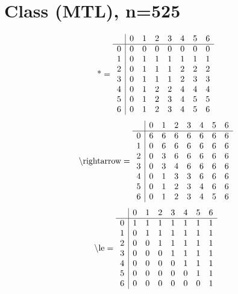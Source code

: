 \documentclass[11pt]{article}
\begin{document}
\section{Class (MTL), n=525}
\[\text{*} = 
\begin{array}{r | r r r r r r r}
 & 0 & 1 & 2 & 3 & 4 & 5 & 6 \\ \hline
0 & 0 & 0 & 0 & 0 & 0 & 0 & 0 \\
1 & 0 & 1 & 1 & 1 & 1 & 1 & 1 \\
2 & 0 & 1 & 1 & 1 & 2 & 2 & 2 \\
3 & 0 & 1 & 1 & 1 & 2 & 3 & 3 \\
4 & 0 & 1 & 2 & 2 & 4 & 4 & 4 \\
5 & 0 & 1 & 2 & 3 & 4 & 5 & 5 \\
6 & 0 & 1 & 2 & 3 & 4 & 5 & 6 \\
\end{array}
\]
\[\text{\textbackslash rightarrow} = 
\begin{array}{r | r r r r r r r}
 & 0 & 1 & 2 & 3 & 4 & 5 & 6 \\ \hline
0 & 6 & 6 & 6 & 6 & 6 & 6 & 6 \\
1 & 0 & 6 & 6 & 6 & 6 & 6 & 6 \\
2 & 0 & 3 & 6 & 6 & 6 & 6 & 6 \\
3 & 0 & 3 & 4 & 6 & 6 & 6 & 6 \\
4 & 0 & 1 & 3 & 3 & 6 & 6 & 6 \\
5 & 0 & 1 & 2 & 3 & 4 & 6 & 6 \\
6 & 0 & 1 & 2 & 3 & 4 & 5 & 6 \\
\end{array}
\]
\[\text{\textbackslash le} = 
\begin{array}{r | r r r r r r r}
 & 0 & 1 & 2 & 3 & 4 & 5 & 6 \\ \hline
0 & 1 & 1 & 1 & 1 & 1 & 1 & 1 \\
1 & 0 & 1 & 1 & 1 & 1 & 1 & 1 \\
2 & 0 & 0 & 1 & 1 & 1 & 1 & 1 \\
3 & 0 & 0 & 0 & 1 & 1 & 1 & 1 \\
4 & 0 & 0 & 0 & 0 & 1 & 1 & 1 \\
5 & 0 & 0 & 0 & 0 & 0 & 1 & 1 \\
6 & 0 & 0 & 0 & 0 & 0 & 0 & 1 \\
\end{array}
\]
\end{document}
